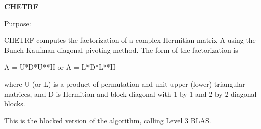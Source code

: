 {\bfseries C\+H\+E\+T\+R\+F} 

 \begin{DoxyParagraph}{Purpose\+: }
\begin{DoxyVerb} CHETRF computes the factorization of a complex Hermitian matrix A
 using the Bunch-Kaufman diagonal pivoting method.  The form of the
 factorization is

    A = U*D*U**H  or  A = L*D*L**H

 where U (or L) is a product of permutation and unit upper (lower)
 triangular matrices, and D is Hermitian and block diagonal with 
 1-by-1 and 2-by-2 diagonal blocks.

 This is the blocked version of the algorithm, calling Level 3 BLAS.\end{DoxyVerb}
 
\end{DoxyParagraph}

